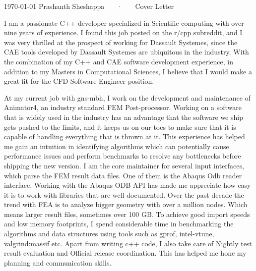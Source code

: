 \documentclass[11pt, a4paper]{awesome-cv}
\newcommand{\company}{Dassault Systemes}
\begin{document}
\makecvheader[R]

\makecvfooter
  {\today}
  {Prashanth Sheshappa ~~~·~~~ Cover Letter}
  {}

\makelettertitle

\begin{cvletter}


I am a passionate C++ developer specialized in Scientific computing with over 
nine years of experience. I found this job posted on the r/cpp subreddit, and I 
was very thrilled at the prospect of working for \company{}, since the 
CAE tools developed by \company{} are ubiquitous in the industry. 
With the combination of my C++ and CAE software development experience, in 
addition to my Masters in Computational Sciences, I believe that I would make 
a great fit for the CFD Software Engineer position.

At my current job with gns-mbh, I work on the development and maintenance of 
Animator4, an industry standard FEM Post-processor. 
Working on a software that is widely used in the industry has an advantage that 
the software we ship gets pushed to the limits, and it keeps us on our toes to 
make sure that it is capable of handling everything that is thrown at it. 
This experience has helped me gain an intuition in identifying algorithms which 
can potentially cause performance issues and perform benchmarks to resolve any 
bottlenecks before shipping the new version.
I am the core maintainer for several input interfaces, which parse the FEM 
result data files. One of them is the Abaqus Odb reader interface. Working with 
the Abaqus ODB API has made me appreciate how easy it is to work with libraries 
that are well documented.
Over the past decade the trend with FEA is to analyze bigger geometry 
with over a million nodes. Which means larger result files, sometimes over 100 
GB. To achieve good import speeds and low memory footprints, I spend 
considerable time in benchmarking the algorithms and data structures using tools
 such as gprof, intel-vtune, valgrind:massif etc. 
Apart from writing c++ code, I also take care of Nightly test result evaluation
and Official release coordination. This has helped me hone my planning and 
communication skills.


\end{cvletter}
\end{document}
